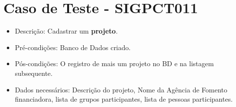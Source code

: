 \documentclass[11pt, a4paper]{book}
\begin{document}
	\section{Caso de Teste - SIGPCT011}
	\begin{itemize}
	\item Descrição: Cadastrar um \textbf{projeto}.
	\item Pré-condições: Banco de Dados criado.
	\item Pós-condições: O registro de mais um projeto no BD e na listagem subsequente.
	\item Dados necessários: Descrição do projeto, Nome da Agência de Fomento financiadora, lista de grupos participantes, lista de pessoas participantes.
	\end{itemize}
    
\end{document}

